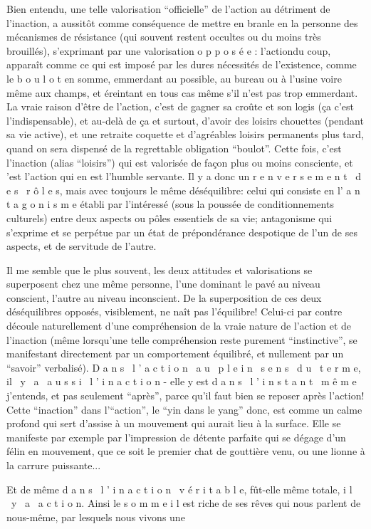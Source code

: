 
Bien entendu, une telle valorisation ``officielle'' de l'action au détriment de l'inaction, a aussitôt comme conséquence de mettre en branle en la personne des mécanismes de résistance (qui souvent restent occultes ou du moins très brouillés), s'exprimant par une valorisation o p p o s é e : l'action\handwritten{,}du coup, apparaît comme ce qui est imposé par les dures nécessités de l'existence, comme le b o u l o t en somme, emmerdant au possible, au bureau ou à l'usine voire même aux champs, et éreintant en tous cas même s'il n'est pas trop emmerdant. La vraie raison d'être de l'action, c'est de gagner sa croûte et son logis (ça c'est l'indispensable), et au-delà de ça et surtout, d'avoir des loisirs chouettes (pendant sa vie active), et une retraite coquette et d'agréables loisirs permanents plus tard, quand on sera dispensé de la regrettable obligation ``boulot''. Cette fois, c'est l'inaction (alias ``loisirs'') qui est valorisée de façon plus ou moins consciente, et 'est l'action qui en est l'humble servante. Il y a donc un r e n v e r s e m e n t \ d e s \ r ô l e s, mais avec toujours le même déséquilibre: celui qui consiste en l' a n t a g o n i s m e établi par l'intéressé (sous la poussée de conditionnements culturels) entre deux aspects ou pôles essentiels de sa vie; antagonisme qui s'exprime et se perpétue par un état de prépondérance despotique de l'un de ses aspects, et de servitude de l'autre.

Il me semble que le plus souvent, les deux attitudes et valorisations se superposent chez une même personne, l'une dominant le pavé au niveau conscient, l'autre au niveau inconscient. De la superposition de ces deux déséquilibres opposés, visiblement, ne naît pas l'équilibre! Celui-ci par contre découle naturellement d'une compréhension de la vraie nature de l'action et de l'inaction (même lorsqu'une telle compréhension reste purement ``instinctive'', se manifestant directement par un comportement équilibré, et nullement par un ``savoir'' verbalisé). D a n s \ l ' a c t i o n \ a u \ p l e i n \ s e n s \ d u \ t e r m e, il \ y \ a \ a u s s i \ l ' i n a c t i o n - elle y est d a n s \ l ' i n s t a n t \ m ê m e j'entends, et pas seulement ``après'', parce qu'il faut bien se reposer après l'action! Cette ``inaction'' dans l'``action'', le ``yin dans le yang'' donc, est comme un calme profond qui sert d'assise à un mouvement qui aurait lieu à la surface. Elle se manifeste par exemple par l'impression de détente parfaite qui se dégage d'un félin en mouvement, que ce soit le premier chat de gouttière venu, ou une lionne à la carrure puissante...

Et de même d a n s \ l ' i n a c t i o n \ v é r i t a b l e, fût-elle même totale, i l \ y \ a \ a c t i o n. Ainsi le s o m m e i l est riche de ses rêves qui nous parlent de nous-même, par lesquels nous vivons une

